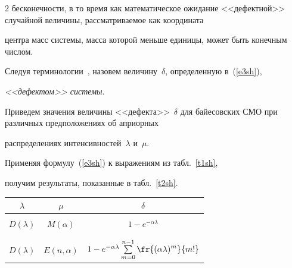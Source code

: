 \begin{multicols}{2}
бесконечности, в то время как математическое ожидание <<дефектной>> случайной величины, рассматриваемое как координата


центра масс системы, масса которой меньше единицы, может быть конечным числом.





Следуя терминологии~\cite{Feller67}, назовем величину~$\delta$, определенную в~(\ref{e3sh}), 


\textit{<<дефектом>> системы}.





Приведем значения величины <<дефекта>>~$\delta$ для байесовских СМО при различных предположениях об априорных


распределениях интенсивностей~$\lambda$ и~$\mu$. 


Применяя формулу~(\ref{e3sh}) к выражениям из табл.~\ref{t1sh}, 


получим результаты, показанные в табл.~\ref{t2sh}.





\begin{table}\small %


\begin{center}




\vspace*{2ex}





\begin{tabular}{|c|c|c|}


\hline


$\lambda$&$\mu$&$\delta$\\


\hline


&&\\[-9pt]


$D(\lambda)$&$M(\alpha)$&$1-e^{-\alpha\lambda}$\\


&&\\[-9pt]


\hline


&&\\[-9pt]


$D(\lambda)$&$E(n,\alpha)$&$1-e^{-\alpha\lambda}\sum\limits_{m=0}^{n-1}\displaystyle\fr{(\alpha\lambda)^m}{m!}$\\



\end{tabular}
\end{center}
\end{table}
\end{multicols}
